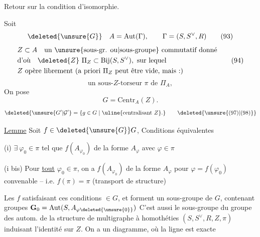  Retour sur la condition d'isomorphie.

Soit
\[
 \deleted{\unsure{G}}\quad A=\mathrm{Aut}(\Gamma),\qquad
 \Gamma=(S,S^\vee,R) \tag*{(93)}
\]
\[
\begin{aligned}
 &Z\subset A\quad\text{un \unsure{sous-gr. ou|sous-groupe} commutatif donné}\\
 &\text{d'où}\quad\deleted{Z}\ \Pi_Z\subset\mathrm{Bij}(S,S^\vee),\ \text{sur lequel}\\
 &Z\text{ opère librement (a priori }\Pi_Z\text{ peut être vide, mais :)}
\end{aligned}\tag*{(94)}
\]
\[
 \text{un sous-}Z\text{-torseur }\pi\text{ de }\Pi_A,\tag*{(95)}
\]
On pose
\[
 G=\mathrm{Centr}_A(Z). \tag*{(96)}
\]
\[
 \deleted{\unsure{G'|\mathcal G'}=\{g\in G\mid\uline{\text{centralisant }Z}.}
 \tag*{\deleted{\unsure{(97)|(98)}}}
\]

\uline{Lemme} Soit $f\in\deleted{\unsure{G}}G$, Conditions équivalentes

(i) $\exists\ \varphi_0\in\pi$ tel que $f(A_{\varphi_0})$ de  la forme $A_\varphi$
avec $\varphi\in\pi$

(i bis) Pour \uline{tout} $\varphi_0\in\pi$, on a $f(A_{\varphi_0})$ de la forme $A_\varphi$
pour $\varphi=f(\varphi_0)$ convenable -- i.e. $f(\pi)=\pi$
(transport de structure)


Les $f$ satisfaisant ces conditions  $\in G$,
et forment un sous-groupe  de $G$, contenant
 groupes  $\mathbf G_0=\mathrm{Aut}(S,A_{\varphi\deleted{\unsure{0}}})$ 
 C'est aussi le sous-groupe
du groupe des autom. de la structure de
multigraphe à homothéties $(S,S^\vee,R,Z,\pi)$
induisant l'identité sur $Z$. On a un
diagramme, où la ligne est exacte

